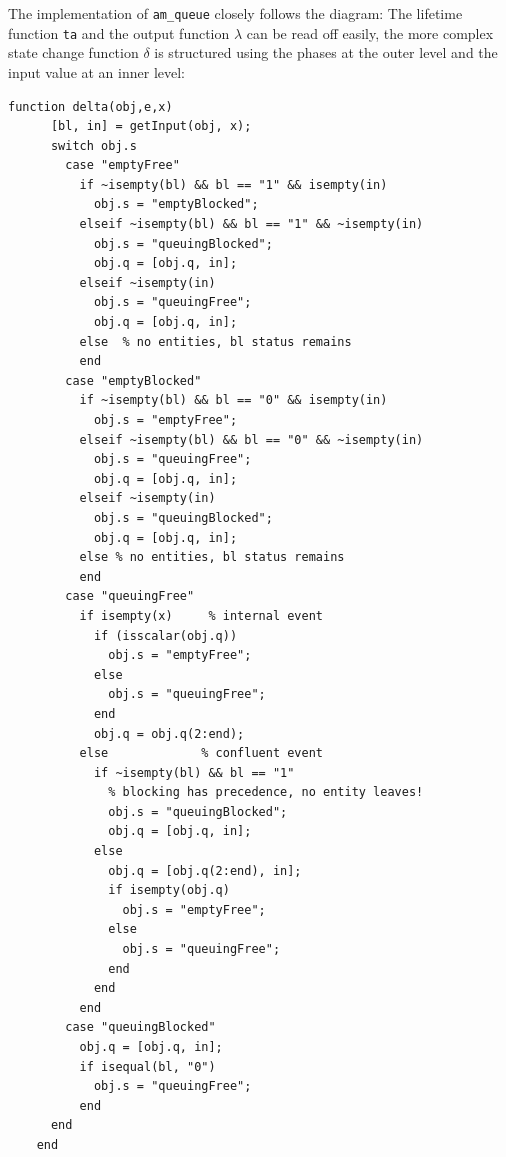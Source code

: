 \documentclass[12pt,oneside,a4paper,bibtotoc,BCOR=0pt,DIV=20]{scrreprt}
\newcommand{\cft}[1]{\mbox{\texttt{#1}}}   %
\begin{document}
The implementation of \cft{am\_queue} closely follows the diagram: The lifetime
function \cft{ta} and the output function $\lambda$ can be read off easily, the
more complex state change function $\delta$ is structured using the phases at
the outer level and the input value at an inner level:
\begin{lstlisting}[caption={$\delta$ function of \cft{am\_queue.m}.},captionpos=b,label=lst4]
    function delta(obj,e,x)
      [bl, in] = getInput(obj, x);
      switch obj.s
        case "emptyFree"
          if ~isempty(bl) && bl == "1" && isempty(in)
            obj.s = "emptyBlocked";
          elseif ~isempty(bl) && bl == "1" && ~isempty(in)
            obj.s = "queuingBlocked";
            obj.q = [obj.q, in];
          elseif ~isempty(in)
            obj.s = "queuingFree";
            obj.q = [obj.q, in];
          else  % no entities, bl status remains
          end
        case "emptyBlocked"
          if ~isempty(bl) && bl == "0" && isempty(in)
            obj.s = "emptyFree";
          elseif ~isempty(bl) && bl == "0" && ~isempty(in)
            obj.s = "queuingFree";
            obj.q = [obj.q, in];
          elseif ~isempty(in)
            obj.s = "queuingBlocked";
            obj.q = [obj.q, in];
          else % no entities, bl status remains
          end
        case "queuingFree"
          if isempty(x)     % internal event
            if (isscalar(obj.q))
              obj.s = "emptyFree";
            else
              obj.s = "queuingFree";
            end
            obj.q = obj.q(2:end);
          else             % confluent event
            if ~isempty(bl) && bl == "1"
              % blocking has precedence, no entity leaves!
              obj.s = "queuingBlocked";
              obj.q = [obj.q, in];
            else
              obj.q = [obj.q(2:end), in];
              if isempty(obj.q)
                obj.s = "emptyFree";
              else
                obj.s = "queuingFree";
              end
            end
          end
        case "queuingBlocked"
          obj.q = [obj.q, in];
          if isequal(bl, "0")
            obj.s = "queuingFree";
          end
      end
    end
\end{lstlisting}
\end{document}
